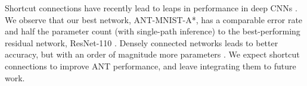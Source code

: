 Shortcut connections \cite{fahlman1990cascade} have recently lead to leaps in performance in deep CNNs \cite{he2016deep,huang2017densely}. We observe that our best network, ANT-MNIST-A*, has a comparable error rate and half the parameter count (with single-path inference) to the best-performing residual network, ResNet-110 \cite{he2016deep}. Densely connected networks leads to better accuracy, but with an order of magnitude more parameters \cite{huang2017densely}. We expect shortcut connections to improve ANT performance, and leave integrating them to future work.



